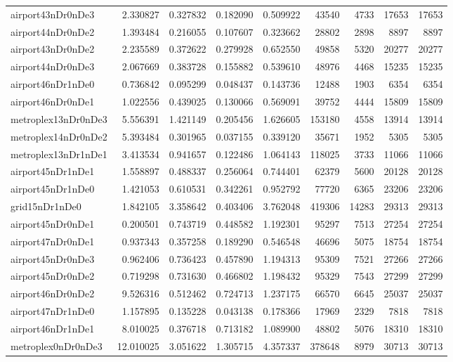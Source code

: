 \begin{longtable}{|l|r|r|r|r|r|r|r|r|}
airport43nDr0nDe3 & 2.330827 & 0.327832 & 0.182090 & 0.509922 & 43540 & 4733 & 17653 & 17653 \\
airport44nDr0nDe2 & 1.393484 & 0.216055 & 0.107607 & 0.323662 & 28802 & 2898 & 8897 & 8897 \\
airport43nDr0nDe2 & 2.235589 & 0.372622 & 0.279928 & 0.652550 & 49858 & 5320 & 20277 & 20277 \\
airport44nDr0nDe3 & 2.067669 & 0.383728 & 0.155882 & 0.539610 & 48976 & 4468 & 15235 & 15235 \\
airport46nDr1nDe0 & 0.736842 & 0.095299 & 0.048437 & 0.143736 & 12488 & 1903 & 6354 & 6354 \\
airport46nDr0nDe1 & 1.022556 & 0.439025 & 0.130066 & 0.569091 & 39752 & 4444 & 15809 & 15809 \\
metroplex13nDr0nDe3 & 5.556391 & 1.421149 & 0.205456 & 1.626605 & 153180 & 4558 & 13914 & 13914 \\
metroplex14nDr0nDe2 & 5.393484 & 0.301965 & 0.037155 & 0.339120 & 35671 & 1952 & 5305 & 5305 \\
metroplex13nDr1nDe1 & 3.413534 & 0.941657 & 0.122486 & 1.064143 & 118025 & 3733 & 11066 & 11066 \\
airport45nDr1nDe1 & 1.558897 & 0.488337 & 0.256064 & 0.744401 & 62379 & 5600 & 20128 & 20128 \\
airport45nDr1nDe0 & 1.421053 & 0.610531 & 0.342261 & 0.952792 & 77720 & 6365 & 23206 & 23206 \\
grid15nDr1nDe0 & 1.842105 & 3.358642 & 0.403406 & 3.762048 & 419306 & 14283 & 29313 & 29313 \\
airport45nDr0nDe1 & 0.200501 & 0.743719 & 0.448582 & 1.192301 & 95297 & 7513 & 27254 & 27254 \\
airport47nDr0nDe1 & 0.937343 & 0.357258 & 0.189290 & 0.546548 & 46696 & 5075 & 18754 & 18754 \\
airport45nDr0nDe3 & 0.962406 & 0.736423 & 0.457890 & 1.194313 & 95309 & 7521 & 27266 & 27266 \\
airport45nDr0nDe2 & 0.719298 & 0.731630 & 0.466802 & 1.198432 & 95329 & 7543 & 27299 & 27299 \\
airport46nDr0nDe2 & 9.526316 & 0.512462 & 0.724713 & 1.237175 & 66570 & 6645 & 25037 & 25037 \\
airport47nDr1nDe0 & 1.157895 & 0.135228 & 0.043138 & 0.178366 & 17969 & 2329 & 7818 & 7818 \\
airport46nDr1nDe1 & 8.010025 & 0.376718 & 0.713182 & 1.089900 & 48802 & 5076 & 18310 & 18310 \\
metroplex0nDr0nDe3 & 12.010025 & 3.051622 & 1.305715 & 4.357337 & 378648 & 8979 & 30713 & 30713 \\

\end{longtable}
